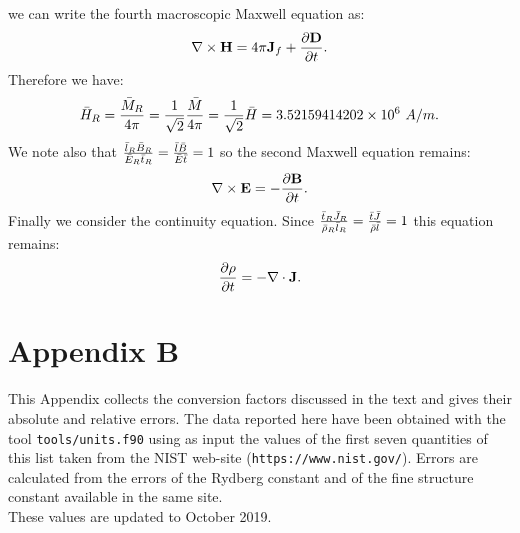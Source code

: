 \documentclass[12pt,a4paper]{article}
\def\barhry{3.52159414202\times 10^{6}}
\begin{document}
{\begin{equation}
\end{equation}
we can write the fourth macroscopic Maxwell equation as:
\begin{equation}
\nabla \times {\bf H}= 4 \pi 
{\bf J}_f + {\partial {\bf D} \over \partial t}.
\end{equation}
Therefore we have:
\begin{equation}
\bar H_R ={\bar M_R \over 4 \pi}={1\over \sqrt{2}} {\bar M \over 4 \pi}=
{1\over \sqrt{2}} \bar H=\barhry\ A/m.
\end{equation}
We note also that ${\bar l_R \bar B_R \over \bar E_R \bar t_R}=
{\bar l \bar B \over \bar E \bar t}=1$ so the second Maxwell equation
remains:
\begin{equation}
\nabla \times {\bf E}=-{\partial {\bf B} \over \partial t}.
\end{equation}
Finally we consider the continuity equation. Since
${\bar t_R \bar J_R \over \bar \rho_R \bar l_R}={\bar t \bar J 
\over \bar \rho \bar l}=1$ this equation remains:
\begin{equation}
{\partial \rho \over \partial t}=-\nabla \cdot {\bf J}.
\end{equation}
}

\newpage

\section{\color{coral} Appendix B}

This Appendix collects the conversion factors discussed in the text
and gives their absolute and relative errors. 
The data reported here have been obtained with the tool 
\texttt{tools/units.f90} using as input the values of the first seven
quantities of this list taken from the NIST web-site 
(\texttt{https://www.nist.gov/}). 
Errors are calculated from the errors of the Rydberg constant and of
the fine structure constant available in the same site. \\
These values are updated to October 2019.
\end{document}
